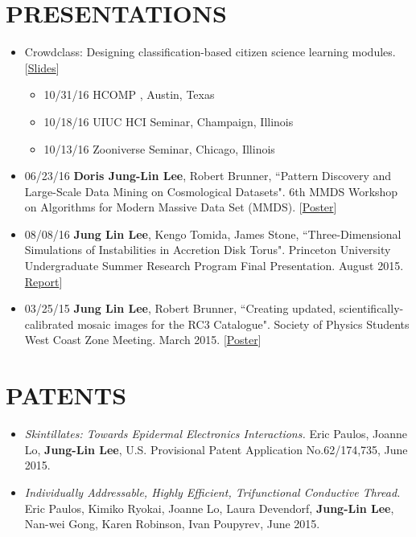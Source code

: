 \documentclass{res}
\begin{document}
\begin{resume}
\section{PRESENTATIONS}
\begin{itemize}
\item Crowdclass: Designing classification-based citizen science learning modules. [\href{https://dorisjunglinlee.com/files/crowdclass_slides.pdf}{Slides}]
	\begin{itemize}[label={$\circ$}]
	\item 10/31/16 HCOMP , Austin, Texas
	\item 10/18/16 UIUC HCI Seminar, Champaign, Illinois
	\item 10/13/16 Zooniverse Seminar, Chicago, Illinois
	\end{itemize}
\item 06/23/16 \textbf{Doris Jung-Lin Lee}, Robert Brunner, ``Pattern Discovery and Large-Scale Data Mining on Cosmological Datasets".  6th MMDS Workshop on Algorithms for Modern Massive Data Set (MMDS).  [\href{https://dorisjunglinlee.com/files/MMDS_poster.pdf}{Poster}]
\item 08/08/16 \textbf{Jung Lin Lee}, Kengo Tomida, James Stone, ``Three-Dimensional Simulations of Instabilities in Accretion Disk Torus". Princeton University Undergraduate Summer Research Program Final Presentation. August 2015. \href{https://dorisjunglinlee.com/files/PrincetonUSRPreport.pdf}{Report}]
\item 03/25/15 \textbf{Jung Lin Lee}, Robert Brunner, ``Creating updated, scientifically-calibrated mosaic images for the RC3 Catalogue". Society of Physics Students West Coast Zone Meeting. March 2015. [\href{http://dorisjunglinlee.com/files/rc3_poster_sps_zone_meeting.pdf}{Poster}]
\end{itemize}
\section{PATENTS}
\begin{itemize}
\item \textit{Skintillates: Towards Epidermal Electronics Interactions.} Eric Paulos, Joanne Lo, \textbf{Jung-Lin Lee}, U.S. Provisional Patent Application No.62/174,735, June 2015.
\item \textit{Individually Addressable, Highly Efficient, Trifunctional Conductive Thread.} Eric Paulos, Kimiko Ryokai, Joanne Lo, Laura Devendorf, \textbf{Jung-Lin Lee}, Nan-wei Gong, Karen Robinson, Ivan Poupyrev, June 2015.
\end{itemize}

\end{resume}
\end{document}
